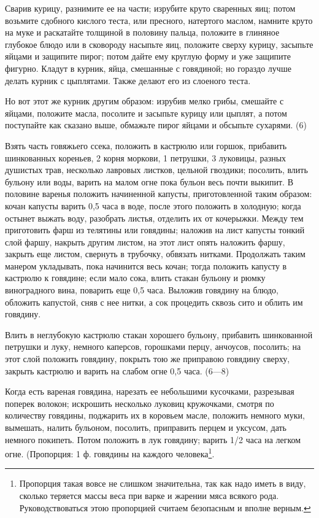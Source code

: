 
Сварив курицу, разнимите ее на части; изрубите круто сваренных яиц; потом возьмите сдобного кислого теста, или пресного, натертого маслом, намните круто на муке и раскатайте толщиной в половину пальца, положите в глиняное глубокое блюдо или в сковороду насыпьте яиц, положите сверху курицу, засыпьте яйцами и защипите пирог; потом дайте ему круглую форму и уже защипите фигурно. Кладут в курник, яйца, смешанные с говядиной; но гораздо лучше делать курник с цыплятами. Также делают его из слоеного теста. 

Но вот этот же курник другим образом: изрубив мелко грибы, смешайте с яйцами, положите масла, посолите и засыпьте курицу или цыплят, а потом поступайте как сказано выше, обмажьте пирог яйцами и обсыпьте сухарями. (6) 


Взять часть говяжьего ссека, положить в кастрюлю или горшок, прибавить шинкованных кореньев, 2 корня моркови, 1 петрушки, 3 луковицы, разных душистых трав, несколько лавровых листков, цельной гвоздики; посолить, влить бульону или воды, варить на малом огне пока бульон весь почти выкипит. В половине варенья положить начиненной капусты, приготовленной таким образом: кочан капусты варить 0,5 часа в воде, после этого положить в холодную; когда остынет выжать воду, разобрать листья, отделить их от кочерыжки. Между тем приготовить фарш из телятины или говядины; наложив на лист капусты тонкий слой фаршу, накрыть другим листом, на этот лист опять наложить фаршу, закрыть еще листом, свернуть в трубочку, обвязать нитками. Продолжать таким манером укладывать, пока начинится весь кочан; тогда положить капусту в кастрюлю к говядине; если мало сока, влить стакан бульону и рюмку виноградного вина, поварить еще 0,5 часа. Выложив говядину на блюдо, обложить капустой, сняв с нее нитки, а сок процедить сквозь сито и облить им говядину. 


Влить в неглубокую кастрюлю стакан хорошего бульону, прибавить шинкованной петрушки и луку, немного каперсов, горошками перцу, анчоусов, посолить; на этот слой положить говядину, покрыть тою же приправою говядину сверху, закрыть кастрюлю и варить на слабом огне 0,5 часа. (6—8) 


Когда есть вареная говядина, нарезать ее небольшими кусочками, разрезывая поперек волокон; искрошить несколько луковиц кружочками, смотря по количеству говядины, поджарить их в коровьем масле, положить немного муки, вымешать, налить бульоном, посолить, приправить перцем и уксусом, дать немного покипеть. Потом положить в лук говядину; варить 1/2 часа на легком огне. (Пропорция: 1 ф. говядины на каждого человека\footnote{Пропорция такая вовсе не слишком значительна, так как надо иметь в виду, сколько теряется массы веса при варке и жарении мяса всякого рода. Руководствоваться этою пропорцией считаем безопасным и вполне верным.}. 

